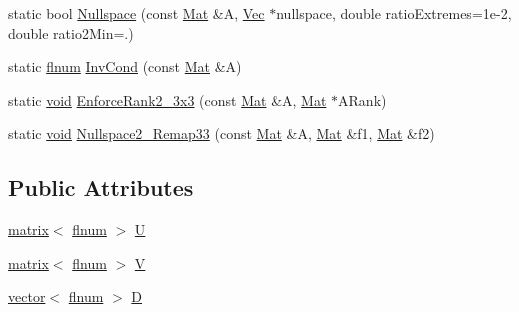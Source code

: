 \begin{DoxyCompactItemize}
static bool \hyperlink{classlibNumerics_1_1SVD_a172568239356247cf1c6cb37ecc7a65a}{Nullspace} (const \hyperlink{classlibNumerics_1_1SVD_af7fa146726f27635a88ef053d5dbd4ab}{Mat} \&A, \hyperlink{classlibNumerics_1_1SVD_ad713d0bff81dcdd50acc63e285fb6c0d}{Vec} $\ast$nullspace, double ratio\+Extremes=1e-\/2, double ratio2\+Min=.)
\item 
static \hyperlink{namespacelibNumerics_ac94c07350f743d00e3dbcb33b6e974b0}{flnum} \hyperlink{classlibNumerics_1_1SVD_a274a137a3f30a85b24ed6a3303f701a7}{Inv\+Cond} (const \hyperlink{classlibNumerics_1_1SVD_af7fa146726f27635a88ef053d5dbd4ab}{Mat} \&A)
\item 
static \hyperlink{png_8h_aa8c59027f9ab2769342f248709d68d17}{void} \hyperlink{classlibNumerics_1_1SVD_a3418e7df7a664148386b52bc60d499f3}{Enforce\+Rank2\+\_\+3x3} (const \hyperlink{classlibNumerics_1_1SVD_af7fa146726f27635a88ef053d5dbd4ab}{Mat} \&A, \hyperlink{classlibNumerics_1_1SVD_af7fa146726f27635a88ef053d5dbd4ab}{Mat} $\ast$A\+Rank)
\item 
static \hyperlink{png_8h_aa8c59027f9ab2769342f248709d68d17}{void} \hyperlink{classlibNumerics_1_1SVD_ac4ff0ad3317252e1d675919c63d446dd}{Nullspace2\+\_\+\+Remap33} (const \hyperlink{classlibNumerics_1_1SVD_af7fa146726f27635a88ef053d5dbd4ab}{Mat} \&A, \hyperlink{classlibNumerics_1_1SVD_af7fa146726f27635a88ef053d5dbd4ab}{Mat} \&f1, \hyperlink{classlibNumerics_1_1SVD_af7fa146726f27635a88ef053d5dbd4ab}{Mat} \&f2)
\end{DoxyCompactItemize}
\subsection*{Public Attributes}
\begin{DoxyCompactItemize}
\item 
\hyperlink{classlibNumerics_1_1matrix}{matrix}$<$ \hyperlink{namespacelibNumerics_ac94c07350f743d00e3dbcb33b6e974b0}{flnum} $>$ \hyperlink{classlibNumerics_1_1SVD_a123cf47ae549129588deccd62c725e24}{U}
\item 
\hyperlink{classlibNumerics_1_1matrix}{matrix}$<$ \hyperlink{namespacelibNumerics_ac94c07350f743d00e3dbcb33b6e974b0}{flnum} $>$ \hyperlink{classlibNumerics_1_1SVD_a21d943de3bbc8754a2e9ea41795a6d96}{V}
\item 
\hyperlink{classlibNumerics_1_1vector}{vector}$<$ \hyperlink{namespacelibNumerics_ac94c07350f743d00e3dbcb33b6e974b0}{flnum} $>$ \hyperlink{classlibNumerics_1_1SVD_a3617939e2eba979cdd7913029d7200d3}{D}
\end{DoxyCompactItemize}


